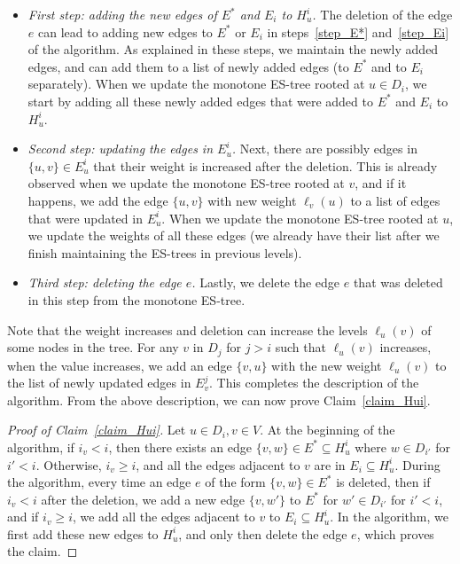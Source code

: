 \begin{itemize}
    \item \textit{First step: adding the new edges of $E^*$ and $E_i$ to $H_u^i$.} The deletion of the edge $e$ can lead to adding new edges to $E^*$ or $E_i$ in steps~\ref{step_E*} and~\ref{step_Ei} of the algorithm. As explained in these steps, we maintain the newly added edges, and can add them to a list of newly added edges (to $E^*$ and to $E_i$ separately). When we update the monotone ES-tree rooted at $u \in D_i$, we start by adding all these newly added edges that were added to $E^*$ and $E_i$ to $H_u^i$.
    \item \textit{Second step: updating the edges in $E_u^i$.} Next, there are possibly edges in $\{u,v\} \in E_u^i$ that their weight is increased after the deletion. This is already observed when we update the monotone ES-tree rooted at $v$, and if it happens, we add the edge $\{u,v\}$ with new weight $\ell_v(u)$ to a list of edges that were updated in $E_u^i$. When we update the monotone ES-tree rooted at $u$, we update the weights of all these edges (we already have their list after we finish maintaining the ES-trees in previous levels).
    \item \textit{Third step: deleting the edge $e$.} Lastly, we delete the edge $e$ that was deleted in this step from the monotone ES-tree. 
\end{itemize}

Note that the weight increases and deletion can increase the levels $\ell_u(v)$ of some nodes in the tree. For any $v$ in $D_j$ for $j > i$ such that $\ell_u(v)$ increases, when the value increases, we add an edge $\{v,u\}$ with the new weight $\ell_u(v)$ to the list of newly updated edges in $E_v^j$. This completes the description of the algorithm.
From the above description, we can now prove Claim~\ref{claim_Hui}. 

\begin{proof}[Proof of Claim~\ref{claim_Hui}]
Let $u \in D_i, v \in V$. At the beginning of the algorithm, if $i_v < i$, then there exists an edge $\{v,w\} \in E^* \subseteq H_u^i$ where $w \in D_{i'}$ for $i' < i$. Otherwise, $i_v \geq i$, and all the edges adjacent to $v$ are in $E_i \subseteq H_u^i$. During the algorithm, every time an edge $e$ of the form $\{v,w\} \in E^*$ is deleted, then if $i_v < i$ after the deletion, we add a new edge $\{v,w'\}$ to $E^*$ for $w' \in D_{i'}$ for $i' < i$, and if $i_v \geq i$, we add all the edges adjacent to $v$ to $E_i \subseteq H_u^i$. In the algorithm, we first add these new edges to $H_u^i$, and only then delete the edge $e$, which proves the claim.
\end{proof}

